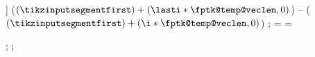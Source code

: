 {{{{{\begin{scope}
{                                ]
                                ($ (\tikzinputsegmentfirst) + (\lasti * \fptk@temp@veclen , 0) $) -- ($ (\tikzinputsegmentfirst) + (\i * \fptk@temp@veclen, 0) $)
                            ;
                        }
                        \ifnum\fptk@range@arrow=\fptk@range@arrow@direct
                            \def\fptk@temp@xa{\tikzinputsegmentfirst}
                            \def\fptk@temp@xb{1cm}
                            \thedraw
                        \else
                            \ifnum\fptk@range@arrow=\fptk@range@arrow@inverse
                                \def\fptk@temp@xa{\tikzinputsegmentlast}
                                \def\fptk@temp@xb{-1cm}
                                \thedraw
                            \fi
                        \fi
                    \end{scope}
                    ;
                    ;
                }
            }
        }
    }
}

\newcommand\rangetop[5]{
    \draw [line width=3\defaultpenwidth] [
        fptk,
        range,
        range start label=#4,
        range end label=#5,
        range segments={#3},
    ] ([yshift=.5\masterunit] #1) -- ([yshift=.5\masterunit] #2);
}

\newcommand\rangeinversetop[5]{
    \draw [line width=3\defaultpenwidth] [
        fptk,
        range,
        range start label=#4,
        range end label=#5,
        range segments={#3},
        range arrow=inverse,
    ] ([yshift=.5\masterunit] #1) -- ([yshift=.5\masterunit] #2);
}

\makeatother